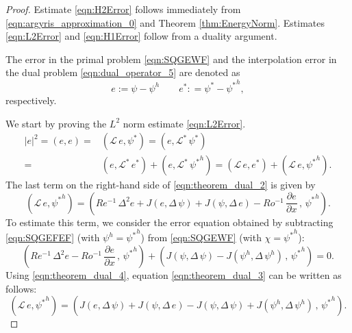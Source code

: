 \begin{proof}
  Estimate \eqref{eqn:H2Error} follows immediately from
  \eqref{eqn:argyris_approximation_0} and Theorem \ref{thm:EnergyNorm}.
  Estimates \eqref{eqn:L2Error} and \eqref{eqn:H1Error} follow from a duality
  argument.

  The error in the primal problem \eqref{eqn:SQGEWF} and the interpolation error
  in the dual problem  \eqref{eqn:dual_operator_5} are denoted as
  \begin{equation}
    e := \psi - \psi^h \qquad e^* : = \psi^* - {\psi^*}^h ,
    \label{eqn:theorem_dual_1}
  \end{equation}
  respectively.

  We start by proving the $L^2$ norm estimate \eqref{eqn:L2Error}.
  \begin{align}
    |e|^2 = (e , e) =& (\mathcal{L} \, e , \psi^*)
      = (e , \mathcal{L}^* \, \psi^*) \nonumber \\
    =& (e , \mathcal{L}^* \, e^*) + (e , \mathcal{L}^* \, {\psi^*}^h)
      = (\mathcal{L} \, e , e^*) + (\mathcal{L} \, e , {\psi^*}^h) .
    \label{eqn:theorem_dual_2}
  \end{align}
  The last term on the right-hand side of \eqref{eqn:theorem_dual_2} is given by
  \begin{equation}
    (\mathcal{L} \, e , {\psi^*}^h) = \left( Re^{-1} \, \Delta^2 e
      + J(e , \Delta \, \psi) + J(\psi , \Delta \, e)
      - Ro^{-1} \, \frac{\partial e}{\partial x} \, , \, {\psi^*}^h \right) .
    \label{eqn:theorem_dual_3}
  \end{equation}
  To estimate this term, we consider the error equation obtained by subtracting
  \eqref{eqn:SQGEFEF} (with $\psi^h= {\psi^*}^h$) from \eqref{eqn:SQGEWF} (with
  $\chi = {\psi^*}^h$):
  \begin{equation}
    \left( Re^{-1} \, \Delta^2 e - Ro^{-1} \, \frac{\partial e}{\partial x} \, ,
      \, {\psi^*}^h \right) + \left( J(\psi , \Delta \, \psi)
      - J(\psi^h , \Delta \, \psi^h) \, , \, {\psi^*}^h \right) = 0 .
    \label{eqn:theorem_dual_4}
  \end{equation}
  Using \eqref{eqn:theorem_dual_4}, equation \eqref{eqn:theorem_dual_3} can be
  written as follows:
  \begin{equation}
    (\mathcal{L} \, e , {\psi^*}^h) = \left( J(e , \Delta \, \psi)
      + J(\psi , \Delta \, e) - J(\psi , \Delta \, \psi)
      + J(\psi^h , \Delta \, \psi^h) \, , \, {\psi^*}^h \right) .
    \label{eqn:theorem_dual_5}
  \end{equation}

\end{proof}
